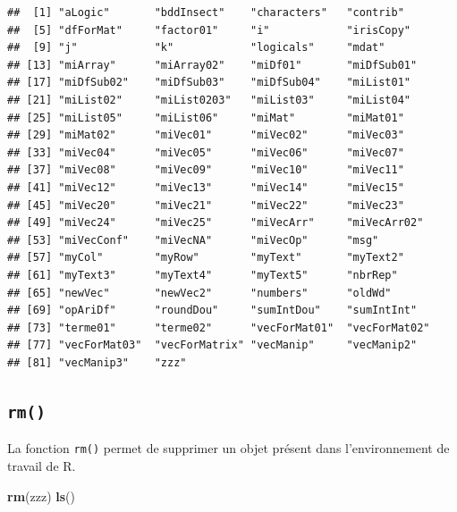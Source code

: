 \documentclass[]{book}
\newenvironment{Shaded}{\begin{snugshade}}{\end{snugshade}}
\newcommand{\KeywordTok}[1]{\textcolor[rgb]{0.13,0.29,0.53}{\textbf{#1}}}
\newcommand{\NormalTok}[1]{#1}
\begin{document}
\begin{verbatim}
##  [1] "aLogic"       "bddInsect"    "characters"   "contrib"     
##  [5] "dfForMat"     "factor01"     "i"            "irisCopy"    
##  [9] "j"            "k"            "logicals"     "mdat"        
## [13] "miArray"      "miArray02"    "miDf01"       "miDfSub01"   
## [17] "miDfSub02"    "miDfSub03"    "miDfSub04"    "miList01"    
## [21] "miList02"     "miList0203"   "miList03"     "miList04"    
## [25] "miList05"     "miList06"     "miMat"        "miMat01"     
## [29] "miMat02"      "miVec01"      "miVec02"      "miVec03"     
## [33] "miVec04"      "miVec05"      "miVec06"      "miVec07"     
## [37] "miVec08"      "miVec09"      "miVec10"      "miVec11"     
## [41] "miVec12"      "miVec13"      "miVec14"      "miVec15"     
## [45] "miVec20"      "miVec21"      "miVec22"      "miVec23"     
## [49] "miVec24"      "miVec25"      "miVecArr"     "miVecArr02"  
## [53] "miVecConf"    "miVecNA"      "miVecOp"      "msg"         
## [57] "myCol"        "myRow"        "myText"       "myText2"     
## [61] "myText3"      "myText4"      "myText5"      "nbrRep"      
## [65] "newVec"       "newVec2"      "numbers"      "oldWd"       
## [69] "opAriDf"      "roundDou"     "sumIntDou"    "sumIntInt"   
## [73] "terme01"      "terme02"      "vecForMat01"  "vecForMat02" 
## [77] "vecForMat03"  "vecForMatrix" "vecManip"     "vecManip2"   
## [81] "vecManip3"    "zzz"
\end{verbatim}

\hypertarget{l015rm}{%
\subsection{\texorpdfstring{\texttt{rm()}}{rm()}}\label{l015rm}}

La fonction \texttt{rm()} permet de supprimer un objet présent dans l'environnement de travail de R.

\begin{Shaded}
\begin{Highlighting}[]
\KeywordTok{rm}\NormalTok{(zzz)}
\KeywordTok{ls}\NormalTok{()}
\end{Highlighting}
\end{Shaded}
\end{document}
